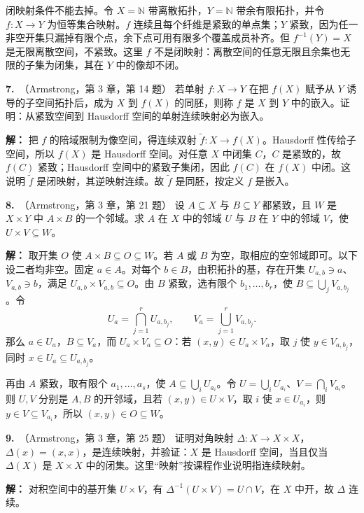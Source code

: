 \documentclass{article}
\newcommand{\problem}[2]{\par\medskip\noindent\textbf{#1.}\ （#2）\quad}
\begin{document}
闭映射条件不能去掉。令 $X=\mathbb N$ 带离散拓扑，$Y=\mathbb N$ 带余有限拓扑，并令 $f:X\to Y$ 为恒等集合映射。$f$ 连续且每个纤维是紧致的单点集；$Y$ 紧致，因为任一非空开集只漏掉有限个点，余下点可用有限多个覆盖成员补齐。但 $f^{-1}(Y)=X$ 是无限离散空间，不紧致。这里 $f$ 不是闭映射：离散空间的任意无限且余集也无限的子集为闭集，其在 $Y$ 中的像却不闭。

\problem{7}{Armstrong，第 3 章，第 14 题}
若单射 $f:X\to Y$ 在把 $f(X)$ 赋予从 $Y$ 诱导的子空间拓扑后，成为 $X$ 到 $f(X)$ 的同胚，则称 $f$ 是 $X$ 到 $Y$ 中的嵌入。证明：从紧致空间到 Hausdorff 空间的单射连续映射必为嵌入。
\par\noindent\textbf{解：}
把 $f$ 的陪域限制为像空间，得连续双射 $\widetilde f:X\to f(X)$。Hausdorff 性传给子空间，所以 $f(X)$ 是 Hausdorff 空间。对任意 $X$ 中闭集 $C$，$C$ 是紧致的，故 $f(C)$ 紧致；Hausdorff 空间中的紧致子集闭，因此 $f(C)$ 在 $f(X)$ 中闭。这说明 $\widetilde f$ 是闭映射，其逆映射连续。故 $\widetilde f$ 是同胚，按定义 $f$ 是嵌入。

\problem{8}{Armstrong，第 3 章，第 21 题}
设 $A\subseteq X$ 与 $B\subseteq Y$ 都紧致，且 $W$ 是 $X\times Y$ 中 $A\times B$ 的一个邻域。求 $A$ 在 $X$ 中的邻域 $U$ 与 $B$ 在 $Y$ 中的邻域 $V$，使 $U\times V\subseteq W$。
\par\noindent\textbf{解：}
取开集 $O$ 使 $A\times B\subseteq O\subseteq W$。若 $A$ 或 $B$ 为空，取相应的空邻域即可。以下设二者均非空。固定 $a\in A$。对每个 $b\in B$，由积拓扑的基，存在开集 $U_{a,b}\ni a$、$V_{a,b}\ni b$，满足 $U_{a,b}\times V_{a,b}\subseteq O$。由 $B$ 紧致，选有限个 $b_1,\ldots,b_r$，使 $B\subseteq\bigcup_jV_{a,b_j}$。令
\[
U_a=\bigcap_{j=1}^rU_{a,b_j},\qquad V_a=\bigcup_{j=1}^rV_{a,b_j}.
\]
那么 $a\in U_a$，$B\subseteq V_a$，而 $U_a\times V_a\subseteq O$：若 $(x,y)\in U_a\times V_a$，取 $j$ 使 $y\in V_{a,b_j}$，同时 $x\in U_a\subseteq U_{a,b_j}$。

再由 $A$ 紧致，取有限个 $a_1,\ldots,a_s$，使 $A\subseteq\bigcup_iU_{a_i}$。令 $U=\bigcup_iU_{a_i}$、$V=\bigcap_iV_{a_i}$。则 $U,V$ 分别是 $A,B$ 的开邻域，且若 $(x,y)\in U\times V$，取 $i$ 使 $x\in U_{a_i}$，则 $y\in V\subseteq V_{a_i}$，所以 $(x,y)\in O\subseteq W$。

\problem{9}{Armstrong，第 3 章，第 25 题}
证明对角映射 $\Delta:X\to X\times X$，$\Delta(x)=(x,x)$，是连续映射，并验证：$X$ 是 Hausdorff 空间，当且仅当 $\Delta(X)$ 是 $X\times X$ 中的闭集。这里“映射”按课程作业说明指连续映射。
\par\noindent\textbf{解：}
对积空间中的基开集 $U\times V$，有 $\Delta^{-1}(U\times V)=U\cap V$，在 $X$ 中开，故 $\Delta$ 连续。
\end{document}
